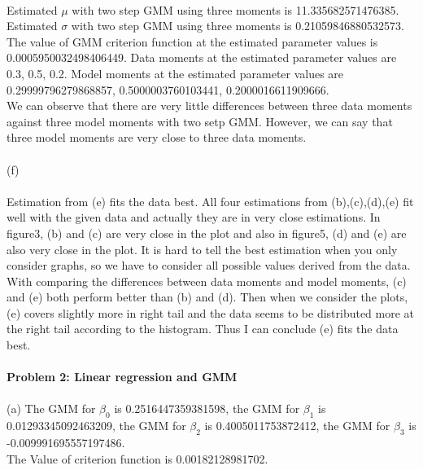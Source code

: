 \documentclass[letterpaper,12pt]{article}
\theoremstyle{definition}
\begin{document}
\noindent\\
Estimated $\mu$ with two step GMM using three moments is 11.335682571476385. Estimated $\sigma$ with two step GMM using three moments is 0.21059846880532573.\\
The value of GMM criterion function at the estimated parameter values is 0.0005950032498406449.
Data moments at the estimated parameter values are 0.3, 0.5, 0.2.
Model moments at the estimated parameter values are 0.29999796279868857, 0.5000003760103441, 0.2000016611909666.\\
We can observe that there are very little differences between three data moments against three model moments with two setp GMM. However, we can say that three model moments are very close to three data moments.
\\
 \textbf \\ {(f)}\\
 \\
 Estimation from (e) fits the data best. All four estimations from (b),(c),(d),(e) fit well with the given data and actually they are in very close estimations. In figure3, (b) and (c) are very close in the plot and also in figure5, (d) and (e) are also very close in the plot. It is hard to tell the best estimation when you only consider graphs, so we have to consider all possible values derived from the data. With comparing the differences between data moments and model moments, (c) and (e) both perform better than (b) and (d). Then when we consider the plots, (e) covers slightly more in right tail and the data seems to be distributed more at the right tail according to the histogram. Thus I can conclude (e) fits the data best.\\
 \\
 
\noindent \textbf{Problem 2: Linear regression and GMM}
 \textbf \\  
 \\ {(a)} The GMM for $\beta_{0}$ is  0.2516447359381598, the GMM for $\beta_{1}$ is 0.01293345092463209, the GMM for $\beta_{2}$ is  0.4005011753872412, the GMM for $\beta_{3}$ is -0.009991695557197486.\\
The Value of criterion function is 0.00182128981702.
\end{document}
